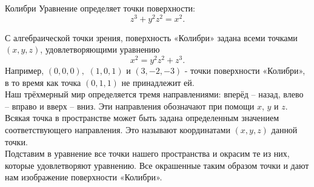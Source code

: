 \begin{surferPage}{Колибри}
Уравнение определяет точки поверхности:\\
  
  \smallskip
\[z^3+ y^2	z^2	= x^2.\]

\singlespacing
С алгебраической точки зрения, поверхность «Колибри» задана всеми точками $(x, y, z)$, удовлетворяющими уравнению
\smallskip
\[ x^2= y^2z^2+z^3.\]
\smallskip
Например, $(0,0,0),$ $(1,0,1)$ и $(3,-2,-3)$  - точки поверхности «Колибри», в то время как точка $(0,1,1)$ не принадлежит ей.\\
 \singlespacing
Наш трёхмерный мир определяется тремя направлениями: вперёд – назад, влево – вправо и вверх – вниз. Эти направления обозначают при помощи $x$, $y$ и $z$. Всякая точка в пространстве может быть задана определенным значением соответствующего направления. Это называют координатами $(x,y,z)$ данной точки. \\
\singlespacing
Подставим в уравнение все точки нашего пространства и окрасим те из них, которые удовлетворяют уравнению. Все окрашенные таким образом точки и дают нам изображение поверхности «Колибри».
\end{surferPage}
